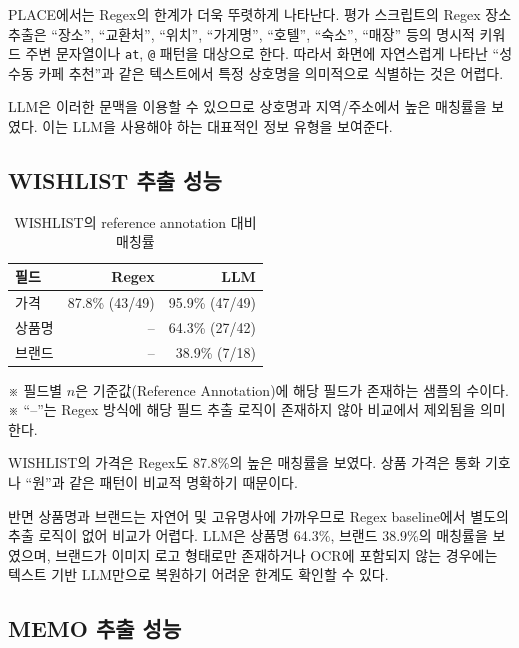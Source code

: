 \documentclass[11pt,a4paper]{article}
\begin{document}
PLACE에서는 Regex의 한계가 더욱 뚜렷하게 나타난다. 평가 스크립트의 Regex 장소 추출은 ``장소'', ``교환처'', ``위치'', ``가게명'', ``호텔'', ``숙소'', ``매장'' 등의 명시적 키워드 주변 문자열이나 \texttt{at}, \texttt{@} 패턴을 대상으로 한다. 따라서 화면에 자연스럽게 나타난 ``성수동 카페 추천''과 같은 텍스트에서 특정 상호명을 의미적으로 식별하는 것은 어렵다.

LLM은 이러한 문맥을 이용할 수 있으므로 상호명과 지역/주소에서 높은 매칭률을 보였다. 이는 LLM을 사용해야 하는 대표적인 정보 유형을 보여준다.

\subsection{WISHLIST 추출 성능}

\begin{table}[H]
\centering
\small
\begin{tabularx}{0.92\linewidth}{l r r}
\toprule
\textbf{필드} & \textbf{Regex} & \textbf{LLM}\\
\midrule
가격 & 87.8\% (43/49) & 95.9\% (47/49)\\
상품명 & -- & 64.3\% (27/42)\\
브랜드 & -- & 38.9\% (7/18)\\
\bottomrule
\end{tabularx}
\caption{WISHLIST의 reference annotation 대비 매칭률}
\end{table}
\vspace{-0.3em}
\begin{flushleft}
\footnotesize ※ 필드별 $n$은 기준값(Reference Annotation)에 해당 필드가 존재하는 샘플의 수이다. ※ ``--''는 Regex 방식에 해당 필드 추출 로직이 존재하지 않아 비교에서 제외됨을 의미한다.
\end{flushleft}


WISHLIST의 가격은 Regex도 87.8\%의 높은 매칭률을 보였다. 상품 가격은 통화 기호나 ``원''과 같은 패턴이 비교적 명확하기 때문이다.

반면 상품명과 브랜드는 자연어 및 고유명사에 가까우므로 Regex baseline에서 별도의 추출 로직이 없어 비교가 어렵다. LLM은 상품명 64.3\%, 브랜드 38.9\%의 매칭률을 보였으며, 브랜드가 이미지 로고 형태로만 존재하거나 OCR에 포함되지 않는 경우에는 텍스트 기반 LLM만으로 복원하기 어려운 한계도 확인할 수 있다.

\subsection{MEMO 추출 성능}
\end{document}
